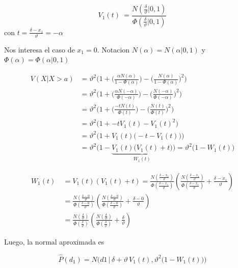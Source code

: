 \documentclass[11pt,twoside,spanish]{report} %
\begin{document}
\begin{equation}
	V_1(t)\ = \frac{N(\frac{\delta}{\vartheta}|0,1)}{\Phi(\frac{\delta}{\vartheta}|0,1) }
\end{equation}
con $t = \frac{\delta -x_1}{\vartheta} = -\alpha  $

Nos interesa el caso de $x_1=0$. Notacion $N(\alpha)=N(\alpha|0,1)$ y $\Phi(\alpha) = \Phi(\alpha|0,1)$

\begin{equation}\label{eq:variance_aprox_}
	\begin{split}
		V(X|  X > a) & = \vartheta^2 \Bigg( 1 + \bigg(\frac{\alpha N(\alpha)}{1 - \Phi(\alpha) }\bigg) - \bigg(\frac{N(\alpha)}{1 - \Phi(\alpha) }\bigg)^2 \Bigg) \\
		& = \vartheta^2 \Bigg( 1 + \bigg(\frac{\alpha N(-\alpha)}{\Phi(-\alpha) }\bigg) - \bigg(\frac{N(-\alpha)}{\Phi(-\alpha) }\bigg)^2 \Bigg) \\
		& = \vartheta^2 \Bigg( 1 + \bigg(\frac{-t N(t)}{\Phi(t) }\bigg) - \bigg(\frac{N(t)}{\Phi(t) }\bigg)^2 \Bigg) \\
		& = \vartheta^2 \Big( 1 +  -t V_1(t) - V_1(t)^2 \Big) \\
		& = \vartheta^2 \Big( 1 + V_1(t) \big(-t  - V_1(t)\big) \Big)  \\
		& = \vartheta^2 \Big( 1 - \underbrace{V_1(t) \big(V_1(t) + t \big)}_{W_1(t)} \Big)  = \vartheta^2 \big( 1 - W_1(t) \big)
	\end{split}
\end{equation}

\begin{equation}
	\begin{split}
		W_1(t)\ &= V_1(t)(V_1(t) + t) = \frac{N(\frac{\delta-x_1}{\vartheta})}{\Phi(\frac{\delta-x_1}{\vartheta})}\left(\frac{N(\frac{\delta-x_1}{\vartheta})}{\Phi(\frac{\delta-x_1}{\vartheta})}+ \frac{\delta -x_1}{\vartheta}\right) \\
		&=\frac{N(\frac{\delta-0}{\vartheta})}{\Phi(\frac{\delta-0}{\vartheta})}\left(\frac{N(\frac{\delta-0}{\vartheta})}{\Phi(\frac{\delta-0}{\vartheta})}+ \frac{\delta -0}{\vartheta}\right)\\
		&=\frac{N(\frac{\delta}{\vartheta})}{\Phi(\frac{\delta}{\vartheta})}\left(\frac{N(\frac{\delta}{\vartheta})}{\Phi(\frac{\delta}{\vartheta})}+ \frac{\delta}{\vartheta}\right)
	\end{split}
\end{equation}

Luego, la normal aproximada es

\begin{equation}\label{eq:p*_d}
	\widehat{P}(d_1) = N\Bigg(d1 \,  \bigg| \,  \delta + \vartheta \, V_1(t) ,  \vartheta^2 \big( 1 - W_1(t) \big)  \Bigg)
\end{equation}
\end{document}
